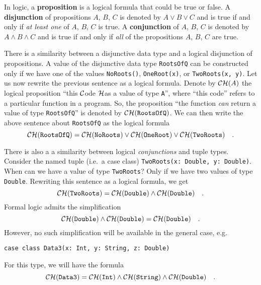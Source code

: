 In logic, a \textbf{proposition} is
a logical formula that could be true or false. A \textbf{disjunction}
of propositions $A$, $B$, $C$ is denoted by $A\vee B\vee C$ and
is true if and only if \emph{at least one} of $A$, $B$, $C$ is
true. A \textbf{conjunction} of $A$,
$B$, $C$ is denoted by $A\wedge B\wedge C$ and is true if and only
if \emph{all} of the propositions $A$, $B$, $C$ are true.

There is a similarity between a disjunctive data type and a logical
disjunction of propositions. A value of the disjunctive data type
\lstinline!RootsOfQ! can be constructed only if we have one of the
values \lstinline!NoRoots()!, \lstinline!OneRoot(x)!, or \lstinline!TwoRoots(x, y)!.
Let us now rewrite the previous sentence as a logical formula. Denote
by ${\cal CH}(A)$ the logical proposition ``this ${\cal C}$ode
${\cal H}$as a value of type \lstinline!A!'', where ``this code''
refers to a particular function in a program. So, the proposition
``the function \emph{can} return a value of type \lstinline!RootsOfQ!''
is denoted by ${\cal CH}(\text{\texttt{RootsOfQ}})$. We can then
write the above sentence about \lstinline!RootsOfQ! as the logical
formula
\begin{equation}
{\cal CH}(\text{\texttt{RootsOfQ}})={\cal CH}(\text{\texttt{NoRoots}})\vee{\cal CH}(\text{\texttt{OneRoot}})\vee{\cal CH}(\text{\texttt{TwoRoots}})\quad.\label{eq:curry-howard-example-disjunction}
\end{equation}

There is also a a similarity between logical \emph{conjunctions} and
tuple types. Consider the named tuple (i.e.~a case class) \lstinline!TwoRoots(x: Double, y: Double)!.
When can we have a value of type \lstinline!TwoRoots!? Only if we
have two values of type \lstinline!Double!. Rewriting this sentence
as a logical formula, we get
\[
{\cal CH}(\text{\texttt{TwoRoots}})={\cal CH}(\text{\texttt{Double}})\wedge{\cal CH}(\text{\texttt{Double}})\quad.
\]
Formal logic admits the simplification
\[
{\cal CH}(\text{\texttt{Double}})\wedge{\cal CH}(\text{\texttt{Double}})={\cal CH}(\text{\texttt{Double}})\quad.
\]
However, no such simplification will be available in the general case,
e.g.
\begin{lstlisting}
case class Data3(x: Int, y: String, z: Double)
\end{lstlisting}
For this type, we will have the formula 
\begin{equation}
{\cal CH}(\text{\texttt{Data3}})={\cal CH}(\text{\texttt{Int}})\wedge{\cal CH}(\text{\texttt{String}})\wedge{\cal CH}(\text{\texttt{Double}})\quad.\label{eq:curry-howard-example-case-class}
\end{equation}

